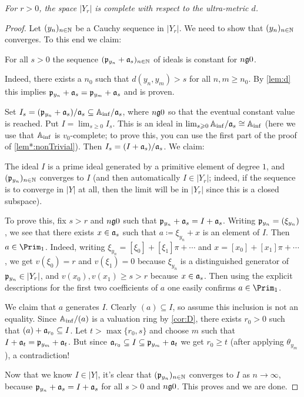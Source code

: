 \label{prop:YrComplete}
\itshape For $r>0$, the space $|Y_r|$ is complete with respect to the ultra-metric $d$.\upshape
\begin{proof}
	Let $(y_n)_{n\in\IN}$ be a Cauchy sequence in $|Y_r|$. We need to show that $(y_n)_{n\in\IN}$ converges. To this end we claim:
	\begin{alphanumerate}
		\item[\itememph{*}] For all $s>0$ the sequence $(\pp_{y_n}+\aa_s)_{n\in\IN}$ of ideals is constant for $n\gge 0$.
	\end{alphanumerate}
	Indeed, there exists a $n_0$ such that $d(y_n,y_m)>s$ for all $n,m\geq n_0$. By \cref{lem:d} this implies $\pp_{y_n}+\aa_{s}=\pp_{y_m}+\aa_{s}$ and \itememph{*} is proven.
	
	Set $I_s=(\pp_{y_n}+\aa_s)/\aa_s\subseteq \IA_\inf/\aa_s$, where $n\gge 0$ so that the eventual constant value is reached. Put $I=\lim_{s\geq 0}I_s$. This is an ideal in $\lim_{s\geq 0}\IA_\inf/\aa_s\cong \IA_\inf$ (here we use that $\IA_\inf$ is $v_0$-complete; to prove this, you can use the first part of the proof of \cref{lem*:nonTrivial}). Then $I_s=(I+\aa_s)/\aa_s$. We claim:
	\begin{alphanumerate}
		\item[\itememph{\boxtimes}] The ideal $I$ is a prime ideal generated by a primitive element of degree $1$, and $(\pp_{y_n})_{n\in\IN}$ converges to $I$ (and then automatically $I\in |Y_r|$; indeed, if the sequence is to converge in $|Y|$ at all, then the limit will be in $|Y_r|$ since this is  a closed subspace).
	\end{alphanumerate}
	To prove this, fix $s>r$ and $n\gge 0$ such that $\pp_{y_n}+\aa_s=I+\aa_s$. Writing $\pp_{y_n}=(\xi_{y_n})$, we see that there exists $x\in\aa_s$ such that $a\coloneqq \xi_{y_n}+x$ is an element of $I$. Then $a\in\Prim_1$. Indeed, writing $\xi_{y_n}=[\xi_0]+[\xi_1]\pi+\dotsb$ and $x=[x_0]+[x_1]\pi+\dotsb$, we get $v(\xi_0)=r$ and $v(\xi_1)=0$ because $\xi_{y_n}$ is a distinguished generator of $\pp_{y_n}\in|Y_r|$, and $v(x_0),v(x_1)\geq s> r$ because $x\in\aa_s$. Then using the explicit descriptions for the first two coefficients of $a$ one easily confirms $a\in\Prim_1$.
	
	We claim that $a$ generates $I$. Clearly $(a)\subseteq I$, so assume this inclusion is not an equality. Since $\IA_\inf/(a)$ is a valuation ring by \cref{cor:D}, there exists $r_0>0$ such that $(a)+\aa_{r_0}\subseteq I$. Let $t>\max\{r_0,s\}$ and choose $m$ such that $I+\aa_t=\pp_{y_m}+\aa_t$. But since $\aa_{r_0}\subseteq I\subseteq \pp_{y_m}+\aa_t$ we get $r_0\geq t$ (after applying $\theta_{y_m}$), a contradiction!
	
	Now that we know $I\in|Y|$, it's clear that $(\pp_{y_n})_{n\in\IN}$ converges to $I$ as $n\to \infty$, because $\pp_{y_n}+\aa_s=I+\aa_s$ for all $s>0$ and $n\gge 0$. This proves \itememph{\boxtimes} and we are done.
\end{proof}
